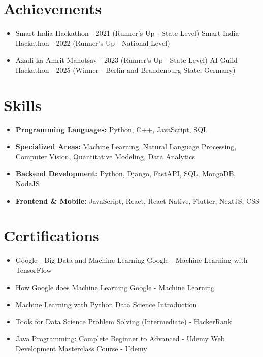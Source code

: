 \documentclass[a4paper,10pt]{article}
\begin{document}
\section*{Achievements}
\begin{itemize}
\item Smart India Hackathon - 2021 (Runner's Up - State Level) \hfill Smart India Hackathon - 2022 (Runner's Up - National Level)
\item Azadi ka Amrit Mahotsav - 2023 (Runner's Up - State Level) \hfill AI Guild Hackathon - 2025 (Winner - Berlin and Brandenburg State, Germany)
\end{itemize}

\section*{Skills}
\begin{itemize}
  \item \textbf{Programming Languages:} Python, C++, JavaScript, SQL
  \item \textbf{Specialized Areas:} Machine Learning, Natural Language Processing, Computer Vision, Quantitative Modeling, Data Analytics
  \item \textbf{Backend Development:} Python, Django, FastAPI, SQL, MongoDB, NodeJS
  \item \textbf{Frontend \& Mobile:} JavaScript, React, React-Native, Flutter, NextJS, CSS
\end{itemize}

\section*{Certifications}
\begin{itemize}
\item Google - Big Data and Machine Learning \hfill Google - Machine Learning with TensorFlow
\item How Google does Machine Learning \hfill Google - Machine Learning
\item Machine Learning with Python \hfill Data Science Introduction
\item Tools for Data Science \hfill Problem Solving (Intermediate) - HackerRank
\item Java Programming: Complete Beginner to Advanced - Udemy \hfill Web Development Masterclass Course - Udemy
\end{itemize}
\end{document}
